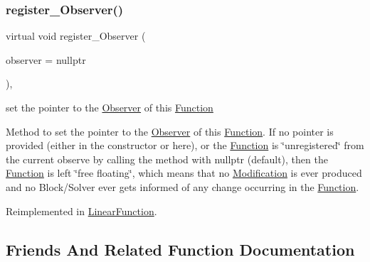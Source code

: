 \subsubsection{\texorpdfstring{register\+\_\+\+Observer()}{register\_Observer()}}
{\footnotesize\ttfamily virtual void register\+\_\+\+Observer (\begin{DoxyParamCaption}\item[{\mbox{\hyperlink{class_s_m_spp__di__unipi__it_1_1_observer}{Observer}} $\ast$const}]{observer = {\ttfamily nullptr} }\end{DoxyParamCaption})\hspace{0.3cm}{\ttfamily [inline]}, {\ttfamily [virtual]}}



set the pointer to the \mbox{\hyperlink{class_s_m_spp__di__unipi__it_1_1_observer}{Observer}} of this \mbox{\hyperlink{class_s_m_spp__di__unipi__it_1_1_function}{Function}} 

Method to set the pointer to the \mbox{\hyperlink{class_s_m_spp__di__unipi__it_1_1_observer}{Observer}} of this \mbox{\hyperlink{class_s_m_spp__di__unipi__it_1_1_function}{Function}}. If no pointer is provided (either in the constructor or here), or the \mbox{\hyperlink{class_s_m_spp__di__unipi__it_1_1_function}{Function}} is \char`\"{}unregistered\char`\"{} from the current observe by calling the method with nullptr (default), then the \mbox{\hyperlink{class_s_m_spp__di__unipi__it_1_1_function}{Function}} is left \char`\"{}free floating\char`\"{}, which means that no \mbox{\hyperlink{class_s_m_spp__di__unipi__it_1_1_modification}{Modification}} is ever produced and no Block/\+Solver ever gets informed of any change occurring in the \mbox{\hyperlink{class_s_m_spp__di__unipi__it_1_1_function}{Function}}. 

Reimplemented in \mbox{\hyperlink{class_s_m_spp__di__unipi__it_1_1_linear_function_a0cb7093b112bfafe0b6d2b44f42fcc5a}{Linear\+Function}}.



\subsection{Friends And Related Function Documentation}
\mbox{\label{class_s_m_spp__di__unipi__it_1_1_function_a23b20b49c11a8fd6f9d37944f073acf2}} 
